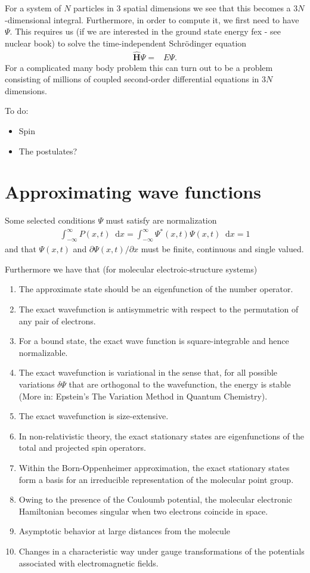 \documentclass[twoside,english]{uiofysmaster}
\newcommand*\dif{\mathop{}\!\mathrm{d}}
\begin{document}
For a system of $N$ particles in 3 spatial dimensions we see that this becomes a $3N$-dimensional integral. Furthermore, in order to compute it, we first need to have $\Psi$. This requires us (if we are interested in the ground state energy fex - see nuclear book) to solve the time-independent Schrödinger equation
\begin{align}
	\hat{\bm{H}} \Psi =& E\Psi .
\end{align}
For a complicated many body problem this can turn out to be a problem consisting of millions of coupled second-order differential equations in $3N$ dimensions.

To do:
\begin{itemize}
	\item Spin
	\item The postulates?
\end{itemize}

\section{Approximating wave functions}
Some selected conditions $\Psi$ must satisfy \cite{HjortJensen2015} are normalization 
\begin{align}
	\int_{-\infty}^{\infty} P(x,t) \dif x = \int_{-\infty}^{\infty} \Psi^{\ast}(x,t) \Psi (x,t) \dif x = 1
\end{align}
and that $\Psi (x,t)$ and $\partial \Psi(x,t) / \partial x$ must be finite, continuous and single valued.

Furthermore we have that \cite{Helgaker2000} (for molecular electroic-structure systems)
\begin{enumerate}
	\item The approximate state should be an eigenfunction of the number operator.
	\item The exact wavefunction is antisymmetric with respect to the permutation of any pair of electrons.
	\item For a bound state, the exact wave function is square-integrable and hence normalizable.
	\item The exact wavefunction is variational in the sense that, for all possible variations $\delta \Psi$ that are orthogonal to the wavefunction, the energy is stable (More in: Epstein's The Variation Method in Quantum Chemistry).
	\item The exact wavefunction is size-extensive. 
	\item In non-relativistic theory, the exact stationary states are eigenfunctions of the total and projected spin operators.
	\item Within the Born-Oppenheimer approximation, the exact stationary states form a basis for an irreducible representation of the molecular point group. 
	\item Owing to the presence of the Couloumb potential, the molecular electronic Hamiltonian becomes singular when two electrons coincide in space.
	\item Asymptotic behavior at large distances from the molecule
	\item Changes in a characteristic way under gauge transformations of the potentials associated with electromagnetic fields.
\end{enumerate}
\end{document}
